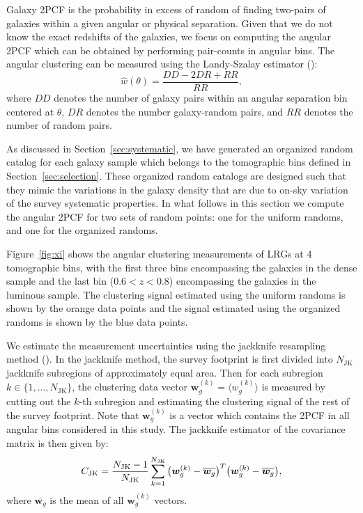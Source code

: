 \documentclass[fleqn,usenatbib,useAMS]{mnras}
\newcommand{\be}{\begin{equation}}
\newcommand{\ee}{\end{equation}}
\newcommand{\dk}{\boldsymbol{w}_{g}^{(k)}}
\newcommand{\dbar}{\overline{\boldsymbol{w}_{g}}}
\newcommand{\njk}{N_{\rm JK}}
\begin{document}
Galaxy 2PCF is the probability in excess of random of finding two-pairs of galaxies within a given angular or physical separation. Given that we do not know the exact redshifts of the galaxies, we focus on computing the angular 2PCF which can be obtained by performing pair-counts in angular bins. The angular clustering can be measured using the Landy-Szalay estimator (\citealt{landy}):
\begin{equation}
    \hat{w}(\theta) = \frac{DD-2DR+RR}{RR},
\label{eq:landy}
\end{equation}
where $DD$ denotes the number of galaxy pairs within an angular separation bin centered at $\theta$, $DR$ denotes the number galaxy-random pairs, and $RR$ denotes the number of random pairs. 

As discussed in Section~\ref{sec:systematic}, we have generated an organized random catalog for each galaxy sample which belongs to the tomographic bins defined in Section~\ref{sec:selection}. These organized random catalogs are designed such that they mimic the variations in the galaxy density that are due to on-sky variation of the survey systematic properties. In what follows in this section we compute the angular 2PCF for two sets of random points: one for the uniform randoms, and one for the organized randoms.

Figure~\ref{fig:xi} shows the angular clustering measurements of LRGs at 4 tomographic bins, with the first three bins encompassing the galaxies in the dense sample and the last bin ($0.6<z<0.8$) encompassing the galaxies in the luminous sample. The clustering signal estimated using the uniform randoms is shown by the orange data points and the signal estimated using the organized randoms is shown by the blue data points. 

We estimate the measurement uncertainties using the jackknife resampling method (\citealt{norberg2009,oliver2016,singh2017,shirasaki2017}). 
In the jackknife method, the survey footprint is first divided into $N_{\mathrm{JK}}$ jackknife subregions of approximately equal area. 
Then for each subregion $k\in\{1,...,N_{\mathrm{JK}}\}$, the clustering data vector $\boldsymbol{w}_{g}^{(k)} = \langle w^{(k)}_{g}\rangle$ is measured by cutting out the $k$-th subregion and estimating the clustering signal of the rest of the survey footprint. Note that $\boldsymbol{w}_{g}^{(k)}$ is a vector which contains the 2PCF in all angular bins considered in this study. The jackknife estimator of the covariance matrix is then given by:
\be 
C_{\rm JK} = \frac{\njk - 1}{\njk}\sum_{k=1}^{\njk}\big(\dk-\dbar\big)^{T}\big(\dk-\dbar\big), 
\label{eq:jk}
\ee
where $\dbar$ is the mean of all $\boldsymbol{w}_{g}^{(k)}$ vectors. 
\end{document}
